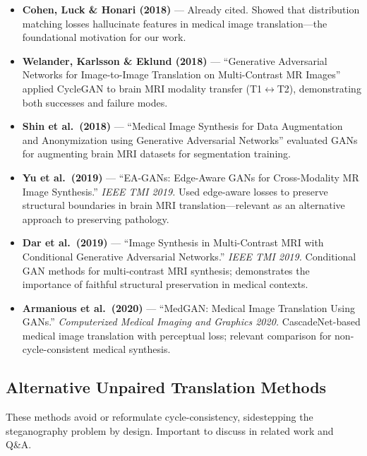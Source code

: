 \documentclass[11pt,a4paper]{article}
\theoremstyle{definition}
\begin{document}
\begin{itemize}
    \item \textbf{Cohen, Luck \& Honari (2018)} --- Already cited. Showed that distribution matching losses hallucinate features in medical image translation---the foundational motivation for our work.

    \item \textbf{Welander, Karlsson \& Eklund (2018)} --- ``Generative Adversarial Networks for Image-to-Image Translation on Multi-Contrast MR Images'' applied CycleGAN to brain MRI modality transfer (T1$\leftrightarrow$T2), demonstrating both successes and failure modes.

    \item \textbf{Shin et al.\ (2018)} --- ``Medical Image Synthesis for Data Augmentation and Anonymization using Generative Adversarial Networks'' evaluated GANs for augmenting brain MRI datasets for segmentation training.

    \item \textbf{Yu et al.\ (2019)} --- ``EA-GANs: Edge-Aware GANs for Cross-Modality MR Image Synthesis.'' \textit{IEEE TMI 2019.} Used edge-aware losses to preserve structural boundaries in brain MRI translation---relevant as an alternative approach to preserving pathology.

    \item \textbf{Dar et al.\ (2019)} --- ``Image Synthesis in Multi-Contrast MRI with Conditional Generative Adversarial Networks.'' \textit{IEEE TMI 2019.} Conditional GAN methods for multi-contrast MRI synthesis; demonstrates the importance of faithful structural preservation in medical contexts.

    \item \textbf{Armanious et al.\ (2020)} --- ``MedGAN: Medical Image Translation Using GANs.'' \textit{Computerized Medical Imaging and Graphics 2020.} CascadeNet-based medical image translation with perceptual loss; relevant comparison for non-cycle-consistent medical synthesis.
\end{itemize}

\subsection{Alternative Unpaired Translation Methods}

These methods avoid or reformulate cycle-consistency, sidestepping the steganography problem by design. Important to discuss in related work and Q\&A.
\end{document}
